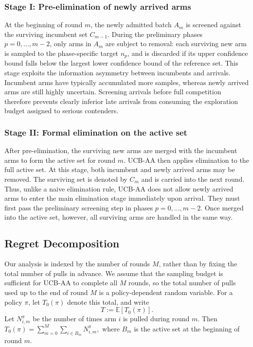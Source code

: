 \documentclass[11pt]{article}
\begin{document}
\subsubsection{Stage I: Pre-elimination of newly arrived arms}

At the beginning of round \(m\), the newly admitted batch \(A_m\) is screened
against the surviving incumbent set \(C_{m-1}\). During the preliminary phases
\(p=0,\ldots,m-2\), only arms in \(A_m\) are subject to removal: each surviving
new arm is sampled to the phase-specific target \(n_p\), and is discarded if its
upper confidence bound falls below the largest lower confidence bound of the
reference set.
This stage exploits the information asymmetry between incumbents and arrivals.
Incumbent arms have typically accumulated more samples, whereas newly arrived
arms are still highly uncertain. Screening arrivals before full competition
therefore prevents clearly inferior late arrivals from consuming the exploration
budget assigned to serious contenders.

\subsubsection{Stage II: Formal elimination on the active set}

After pre-elimination, the surviving new arms are merged with the incumbent arms to form
the active set for round \(m\). UCB-AA then applies elimination to the full active set.
At this stage, both incumbent and newly arrived arms may be removed. The surviving set is
denoted by \(C_m\) and is carried into the next round. Thus, unlike a naive elimination rule, UCB-AA does not allow newly arrived arms to enter the main elimination stage immediately upon arrival. They must first pass the preliminary screening step in phases $p=0,\ldots,m-2$. Once merged into the active set, however, all surviving arms are handled in the same way.


\subsection{Regret Decomposition}
\label{sec: Regret Decomposition}
Our analysis is indexed by the number of rounds \(M\), rather than by fixing the total
number of pulls in advance. We assume that the sampling budget is sufficient for UCB-AA
to complete all \(M\) rounds, so the total number of pulls used up to the end of round \(M\)
is a policy-dependent random variable. For a policy \(\pi\), let \(T_0(\pi)\) denote this total,
and write
\[
T:=\mathbb{E}[T_0(\pi)].
\]
Let \(N^\pi_{i,m}\) be the number of times arm \(i\) is
pulled during round \(m\). Then \(
T_0(\pi)=\sum_{m=0}^M \sum_{i\in B_m} N^\pi_{i,m},\)
where \(B_m\) is the active set at the beginning of round \(m\).
\end{document}

